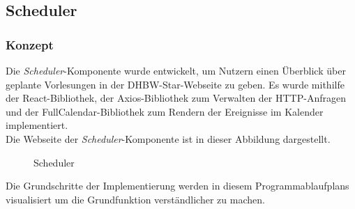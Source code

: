 \subsection{Scheduler}
\subsubsection{Konzept}
Die \emph{Scheduler}-Komponente wurde entwickelt, um Nutzern einen Überblick über geplante Vorlesungen in der DHBW-Star-Webseite zu geben. Es wurde mithilfe der React-Bibliothek, der Axios-Bibliothek zum Verwalten der HTTP-Anfragen und der FullCalendar-Bibliothek zum Rendern der Ereignisse im Kalender implementiert.\\
Die Webseite der \emph{Scheduler}-Komponente ist in dieser Abbildung dargestellt.\\
\begin{figure}[htbp]
	\centering
	\caption{Scheduler}
\end{figure}
\newpage
Die Grundschritte der Implementierung werden in diesem Programmablaufplans visualisiert um die Grundfunktion verständlicher zu machen.
